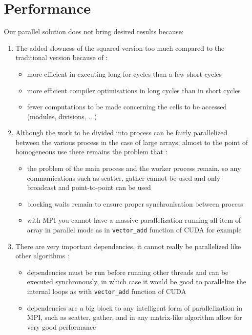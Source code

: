 \section{Performance}\label{performance}

Our parallel solution does not bring desired results because:
\begin{enumerate}
    \item \label{overhead-squared} The added slowness of the squared version too much compared to the traditional version because of \cite{rucci}: 
    \begin{itemize}
        \item more efficient in executing long for cycles than a few short cycles
        \item more efficient compiler optimisations in long cycles than in short cycles
        \item fewer computations to be made concerning the cells to be accessed (modules, divisions, ...)
    \end{itemize}
    \item \label{overhead-mpi} Although the work to be divided into process can be fairly parallelized between the various process in the case of large arrays, almost to the point of homogeneous use there remains the problem that \cite{koallen}:
    \begin{itemize}
        \item the problem of the main process and the worker process remain, so any communications such as scatter, gather cannot be used and only broadcast and point-to-point can be used
        \item blocking waits remain to ensure proper synchronisation between process
        \item with MPI you cannot have a massive parallelization running all item of array in parallel mode  as in  \texttt{vector\_add} function of CUDA for example
    \end{itemize}
    \item \label{overhead-dependencies} There are very important dependencies, it cannot really be parallelized like other algorithms \cite{rucci}:
    \begin{itemize}
        \item dependencies must be run before running other threads and can be executed synchronously, in which case it would be good to parallelize the internal loops as with  \texttt{vector\_add} function of CUDA
        \item dependencies are a big block to any intelligent form of parallelization in MPI, such as scatter, gather, and in any matrix-like algorithm allow for very good performance

\end{itemize}
\end{enumerate}
